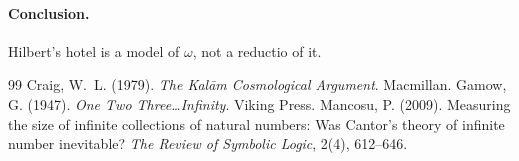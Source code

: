 \documentclass{situationist-preprint}
\begin{document}
\paragraph{Conclusion.} Hilbert's hotel is a model of $\omega$, not a reductio of it.

\begin{thebibliography}{99}\small
{} Craig, W.~L. (1979). \emph{The Kalām Cosmological Argument}. Macmillan.
 Gamow, G. (1947). \emph{One Two Three\ldots Infinity}. Viking Press.
 Mancosu, P. (2009). Measuring the size of infinite collections of natural numbers: Was Cantor's theory of infinite number inevitable? \emph{The Review of Symbolic Logic}, 2(4), 612--646.
\end{thebibliography}
\end{document}
